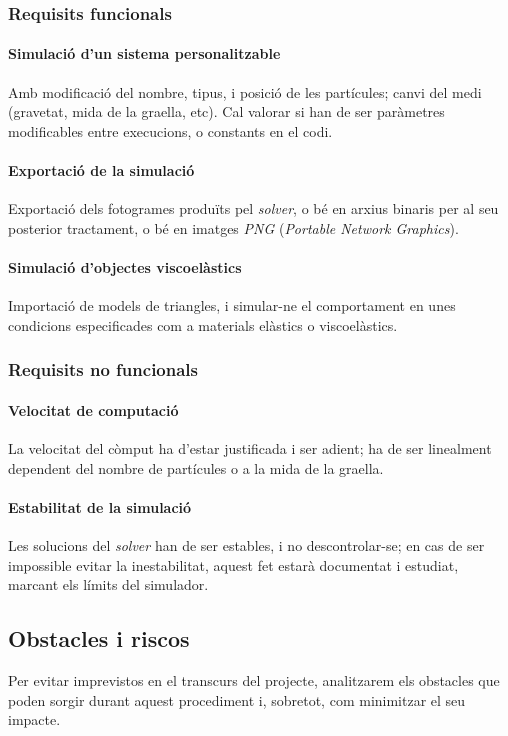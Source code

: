 \documentclass[a4paper]{report}
\begin{document}
	\subsubsection{Requisits funcionals}
	\paragraph{\quad Simulació d'un sistema personalitzable} Amb modificació del nombre, tipus, i posició de les partícules; canvi del medi (gravetat, mida de la graella, etc). Cal valorar si han de ser paràmetres modificables entre execucions, o constants en el codi.
	\paragraph{\quad Exportació de la simulació} Exportació dels fotogrames produïts pel \textit{solver}, o bé en arxius binaris per al seu posterior tractament, o bé en imatges \textit{PNG} (\textit{Portable Network Graphics}).
 	\paragraph{\quad Simulació d'objectes viscoelàstics} Importació de models de triangles, i simular-ne el comportament en unes condicions especificades com a materials elàstics o viscoelàstics.
	
	\subsubsection{Requisits no funcionals}
	\paragraph{\quad Velocitat de computació} La velocitat del còmput ha d'estar justificada i ser adient; ha de ser linealment dependent del nombre de partícules o a la mida de la graella.
	\paragraph{\quad Estabilitat de la simulació} Les solucions del \textit{solver} han de ser estables, i no descontrolar-se; en cas de ser impossible evitar la inestabilitat, aquest fet estarà documentat i estudiat, marcant els límits del simulador.
	
	
	\subsection{Obstacles i riscos}
	Per evitar imprevistos en el transcurs del projecte, analitzarem els obstacles que poden sorgir durant aquest procediment i, sobretot, com minimitzar el seu impacte.
\end{document}
